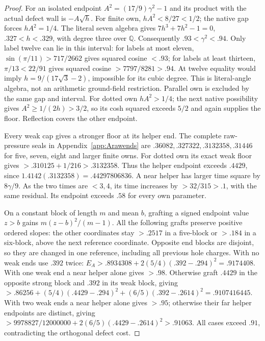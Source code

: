 \documentclass[11pt]{article}
\theoremstyle{definition}
\theoremstyle{remark}
\begin{document}
\begin{proof}
For an isolated endpoint $A^2=(17/9)\gamma^2-1$ and its
product with the actual defect wall is $-A\sqrt h$.
For finite own, $hA^2<8/27<1/2$; the native gap forces
$hA^2=1/4$. The literal seven algebra gives
$7h^3+7h^2-1=0$, $.327<h<.329$, with degree three over
$\mathbb Q$. Consequently $.93<\gamma^2<.94$.
Only label twelve can lie in this interval: for labels at most
eleven, $\sin(\pi/11)>717/2662$ gives squared cosine $<.93$;
for labels at least thirteen, $\pi/13<22/91$ gives squared
cosine $>7797/8281>.94$.
At twelve equality would imply $h=9/(17\sqrt3-2)$, impossible
for its cubic degree. This is literal-angle algebra, not an
arithmetic ground-field restriction. Parallel own is excluded
by the same gap and interval. For dotted own $hA^2>1/4$;
the next native possibility gives $A^2\ge1/(2h)>3/2$,
so its cosh squared exceeds $5/2$ and again supplies the floor.
Reflection covers the other endpoint.

Every weak cap gives a stronger floor at its helper end.
The complete raw-pressure seals in Appendix~\ref{app:Arawends}
are $.36082,.327322,.3132358,.31446$ for five, seven, eight
and larger finite owns. For dotted own its exact weak floor
gives $>.310125+1/216>.3132358$.
Thus the helper endpoint exceeds $.4429$, since
$1.4142(.3132358)=.44297806836$.
A near helper has larger time square by $8\gamma/9$.
As the two times are $<3,4$, its time increases by
$>32/315>.1$, with the same residual. Its endpoint exceeds
$.58$ for every own parameter.

On a constant block of length $m$ and mean $b$, grafting a
signed endpoint value $z>b$ gains $m(z-b)^2/(m-1)$.
All the following grafts preserve positive ordered slopes:
the other coordinates stay $>.2517$ in a five-block or
$>.184$ in a six-block, above the next reference coordinate.
Opposite end blocks are disjoint, so they are changed in one
reference, including all previous hole charges.
With no weak ends use $.392$ twice:
$E_A>.8934308+2(5/4)(.392-.294)^2=.9174408$.
With one weak end a near helper alone gives $>.98$.
Otherwise graft $.4429$ in the opposite strong block and
$.392$ in its weak block, giving
$>.86256+(5/4)(.4429-.294)^2+(6/5)(.392-.2614)^2
=.9107416445$.
With two weak ends a near helper alone gives $>.95$;
otherwise their far helper endpoints are distinct, giving
$>9978827/12000000+2(6/5)(.4429-.2614)^2>.91063$.
All cases exceed $.91$, contradicting the orthogonal defect cost.
\end{proof}
\end{document}
